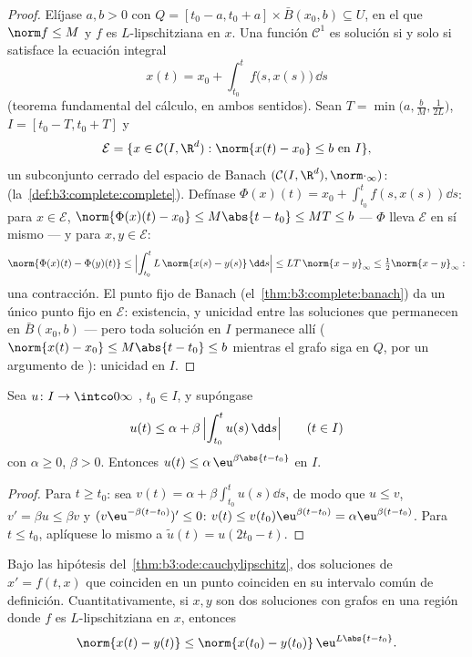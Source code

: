 \begin{proof}
Elíjase $a, b > 0$ con $Q = [t_0 - a, t_0 + a]\times\bar
B(x_0, b) \subseteq U$, en el que $\norm f \leq M$ y $f$ es
$L$-lipschitziana en $x$. Una función $\mathcal C^1$ es solución si y
solo si satisface la ecuación integral
\[
x(t) = x_0 + \int_{t_0}^{t}f\bigl(s, x(s)\bigr)\,\dd s
\]
(teorema fundamental del cálculo, en ambos sentidos). Sean $T =
\min\bigl(a, \frac bM, \frac1{2L}\bigr)$, $I = [t_0 - T, t_0
+ T]$ y
\[
\mathcal E = \{x \in \mathcal C(I, \R^d) : \norm{x(t) - x_0}
\leq b\ \text{en } I\},
\]
un subconjunto cerrado del espacio de Banach $(\mathcal C(I, \R^d),
\norm\cdot_\infty)$: 
(la~\cref{def:b3:complete:complete}). Defínase $\Phi(x)(t) = x_0 +
\int_{t_0}^tf(s, x(s))\dd s$: para $x \in \mathcal E$,
$\norm{\Phi(x)(t) - x_0} \leq M\abs{t - t_0} \leq MT \leq b$
--- $\Phi$ lleva $\mathcal E$ en sí mismo --- y para $x, y \in
\mathcal E$:
\[
\norm{\Phi(x)(t) - \Phi(y)(t)} \leq \Bigl|\int_{t_0}^t
L\,\norm{x(s) - y(s)}\,\dd s\Bigr| \leq LT\,\norm{x -
y}_\infty \leq \tfrac12\norm{x - y}_\infty :
\]
una contracción. El punto fijo de Banach
(el~\cref{thm:b3:complete:banach}) da un único punto fijo en
$\mathcal E$: existencia, y unicidad entre las soluciones que permanecen
en $\bar B(x_0, b)$ --- pero toda solución en $I$ permanece allí
($\norm{x(t) - x_0} \leq M\abs{t - t_0} \leq b$ mientras el grafo siga
en $Q$, por un argumento de
): unicidad en $I$.
\end{proof}

\begin{lemma}[Grönwall]\label{lem:b3:ode:gronwall}
Sea $u \colon I \to \intco0\infty$
, $t_0 \in
I$, y supóngase
\[
u(t) \leq \alpha + \beta\,\Bigl|\int_{t_0}^{t}u(s)\,\dd
s\Bigr| \qquad (t \in I)
\]
con $\alpha \geq 0$, $\beta > 0$. Entonces $u(t) \leq
\alpha\,\eu^{\beta\abs{t - t_0}}$ en $I$.
\end{lemma}

\begin{proof}
Para $t \geq t_0$: sea $v(t) = \alpha +
\beta\int_{t_0}^tu(s)\dd s$, de modo que $u \leq v$, $v' = \beta u
\leq \beta v$ y $(v\eu^{-\beta(t - t_0)})' \leq 0$: $v(t)
\leq v(t_0)\eu^{\beta(t-t_0)} = \alpha\eu^{\beta(t - t_0)}$. Para
$t \leq t_0$, aplíquese lo mismo a $\tilde u(t) = u(2t_0 -
t)$.
\end{proof}

\begin{corollary}
\label{cor:b3:ode:uniqueness}
Bajo las hipótesis del~\cref{thm:b3:ode:cauchylipschitz}, dos soluciones
de $x' = f(t,x)$ que coinciden en un punto coinciden en su intervalo
común de definición. Cuantitativamente, si $x, y$ son dos soluciones con
grafos en una región donde $f$ es $L$-lipschitziana en $x$, entonces
\[
\norm{x(t) - y(t)} \leq \norm{x(t_0) -
y(t_0)}\,\eu^{L\abs{t - t_0}} .
\]
\end{corollary}

